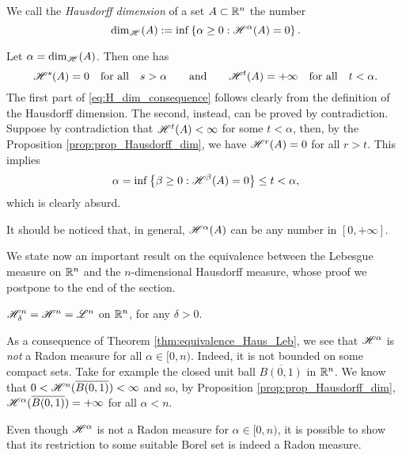 \begin{definition}
We call the \emph{Hausdorff dimension} of a set $A\subset \mathbb{R}^n$ the number
\[
{\rm dim}_{\mathscr{H}^{}}(A) := \inf\left\{ \alpha \geq 0 : \mathscr{H}^{\alpha}(A) = 0
\right\}.
\]
\end{definition}

\begin{remark}
Let $\alpha = {\rm dim}_{\mathscr{H}^{}}(A)$. Then one has
\begin{equation} \label{eq:H_dim_consequence}
\mathscr{H}^{s}(A) = 0 \quad \text{for all} \quad s > \alpha
\qquad \text{and} \qquad
\mathscr{H}^{t}(A) = +\infty \quad \text{for all} \quad t < \alpha.
\end{equation}
The first part of \eqref{eq:H_dim_consequence} follows clearly from the definition of the Hausdorff dimension. The second, instead, can be proved by contradiction. Suppose by contradiction that $\mathscr{H}^{t}(A) < \infty$ for some $t < \alpha$, then, by the Proposition \ref{prop:prop_Hausdorff_dim}, we have $\mathscr{H}^{r}(A) = 0$ for all $ r > t$. This implies 
$$\alpha = \inf\left\{ \beta \geq 0 : \mathscr{H}^{\beta}(A) = 0
\right\} \le t < \alpha,$$
which is clearly absurd.

It should be noticed that, in general, $\mathscr{H}^{\alpha}(A)$ can be any number in $[0, + \infty]$.
\end{remark}

We state now an important result on the equivalence between the Lebesgue measure on $\mathbb{R}^{n}$ and the $n$-dimensional Hausdorff measure, whose proof we postpone to the end of the section.

\begin{theorem} \label{thm:equivalence_Haus_Leb}
$\mathscr{H}^{n}_{\delta} = \mathscr{H}^{n} = \mathscr{L}^{n}$ on $\mathbb{R}^{n}$, for any $\delta > 0$.
\end{theorem}

\begin{remark}
As a consequence of Theorem \ref{thm:equivalence_Haus_Leb}, we see that $\mathscr{H}^{\alpha}$ is \emph{not} a Radon measure for all $\alpha \in
[0,n)$. Indeed, it is not bounded on some compact sets. Take for example the closed unit ball $\overline{B(0,1)}$ in $\mathbb{R}^n$. We know that $0 < \mathscr{H}^{n}(\overline{B(0,1)}) < \infty$ and so, by Proposition \ref{prop:prop_Hausdorff_dim},
$\mathscr{H}^{\alpha}(\overline{B(0,1)}) = +\infty$ for all $\alpha < n$.
\end{remark}

Even though $\mathscr{H}^{\alpha}$ is not a Radon measure for $\alpha \in [0, n)$, it is possible to show that its restriction to some suitable Borel set is indeed a Radon measure.

